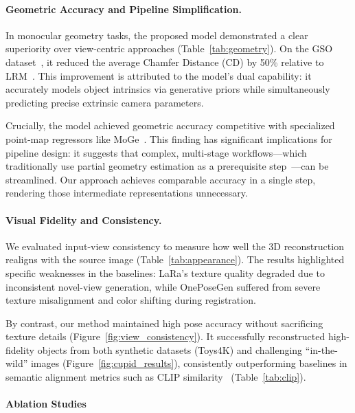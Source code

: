 \documentclass[../../book-main.tex]{subfiles}
\begin{document}
\paragraph{Geometric Accuracy and Pipeline Simplification.}
In monocular geometry tasks, the proposed model demonstrated a clear
superiority over view-centric approaches (Table~\ref{tab:geometry}).
On the GSO dataset~\citep{downs2022google}, it reduced the average
Chamfer Distance (CD) by 50\% relative to LRM~\citep{hong2023lrm}.
This improvement is attributed to the model's dual capability: it
accurately models object intrinsics via generative priors while
simultaneously predicting precise extrinsic camera parameters.

Crucially, the model achieved geometric accuracy competitive with
specialized point-map regressors like MoGe~\citep{wang2025moge}. This
finding has significant implications for pipeline design: it suggests
that complex, multi-stage workflows—which traditionally use partial
geometry estimation as a prerequisite
step~\citep{yao2025castcomponentaligned3dscene}—can be streamlined.
Our approach achieves comparable accuracy in a single step, rendering
those intermediate representations unnecessary.

\paragraph{Visual Fidelity and Consistency.}
We evaluated input-view consistency to measure how well the 3D
reconstruction realigns with the source image
(Table~\ref{tab:appearance}). The results highlighted specific
weaknesses in the baselines: LaRa's texture quality degraded due to
inconsistent novel-view generation, while OnePoseGen suffered from
severe texture misalignment and color shifting during registration.

By contrast, our method maintained high pose accuracy without
sacrificing texture details (Figure~\ref{fig:view_consistency}). It
successfully reconstructed high-fidelity objects from both synthetic
datasets (Toys4K) and challenging ``in-the-wild'' images
(Figure~\ref{fig:cupid_results}), consistently outperforming
baselines in semantic alignment metrics such as CLIP
similarity~\citep{radford2021learning} (Table~\ref{tab:clip}).

\paragraph{Ablation Studies}
\label{sec:ablation}
\end{document}
